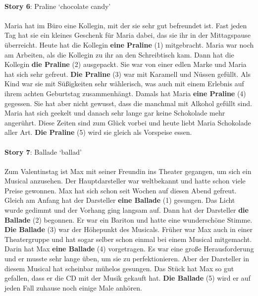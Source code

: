 \\
\textbf{Story 6}: Praline `chocolate candy'\\
\\
Maria hat im Büro eine Kollegin, mit der sie sehr gut befreundet ist. Fast jeden Tag hat sie ein kleines Geschenk für Maria dabei, das sie ihr in der Mittagspause überreicht. Heute hat die Kollegin \textbf{eine Praline} (1) mitgebracht. Maria war noch am Arbeiten, als die Kollegin zu ihr an den Schreibtisch kam. Dann hat die Kollegin \textbf{die Praline} (2) ausgepackt. Sie war von einer edlen Marke und Maria hat sich sehr gefreut. \textbf{Die Praline} (3) war mit Karamell und Nüssen gefüllt. Als Kind war sie mit Süßigkeiten sehr wählerisch, was auch mit einem Erlebnis auf ihrem achten Geburtstag zusammenhängt. Damals hat Maria \textbf{eine Praline} (4) gegessen. Sie hat aber nicht gewusst, dass die manchmal mit Alkohol gefüllt sind. Maria hat sich geekelt und danach sehr lange gar keine Schokolade mehr angerührt. Diese Zeiten sind zum Glück vorbei und heute liebt Maria Schokolade aller Art. \textbf{Die Praline} (5) wird sie gleich als Vorspeise essen.\\
\\
\textbf{Story 7}: Ballade `ballad'\\
\\
Zum Valentinstag ist Max mit seiner Freundin ins Theater gegangen, um sich ein Musical anzusehen. Der Hauptdarsteller war weltbekannt und hatte schon viele Preise gewonnen. Max hat sich schon seit Wochen auf diesen Abend gefreut. Gleich am Anfang hat der Darsteller \textbf{eine Ballade} (1) gesungen. Das Licht wurde gedimmt und der Vorhang ging langsam auf. Dann hat der Darsteller \textbf{die Ballade} (2) begonnen. Er war ein Bariton und hatte eine wunderschöne Stimme. \textbf{Die Ballade} (3) war der Höhepunkt des Musicals. Früher war Max auch in einer Theatergruppe und hat sogar selber schon einmal bei einem Musical mitgemacht. Darin hat Max \textbf{eine Ballade} (4) vorgetragen. Es war eine große Herausforderung und er musste sehr lange üben, um sie zu perfektionieren. Aber der Darsteller in diesem Musical hat scheinbar mühelos gesungen. Das Stück hat Max so gut gefallen, dass er die CD mit der Musik gekauft hat. \textbf{Die Ballade} (5) wird er auf jeden Fall zuhause noch einige Male anhören.

